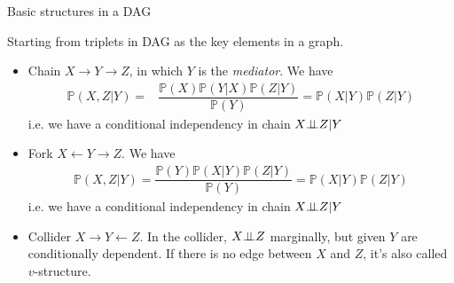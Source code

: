 \begin{point}
    Basic structures in a DAG 
\end{point}

Starting from triplets in DAG as the key elements in a graph.
\begin{itemize}[topsep=2pt,itemsep=0pt]
    \item Chain $ X\to Y\to Z $, in which $ Y $ is the \textit{mediator}. We have
    \begin{align}
        \mathbb{P}\left( X,Z|Y \right)=&\dfrac{\mathbb{P}\left( X \right) \mathbb{P}\left( Y|X \right) \mathbb{P}\left( Z|Y \right) }{\mathbb{P}\left( Y \right) }=\mathbb{P}\left( X|Y \right) \mathbb{P}\left( Z|Y \right) 
    \end{align}
    i.e. we have a conditional independency in chain $ X\bot\!\!\!\bot Z|Y $
    \item Fork $ X\leftarrow Y\rightarrow Z $. We have
    \begin{align}
        \mathbb{P}\left( X,Z|Y \right) = \dfrac{\mathbb{P}\left( Y \right) \mathbb{P}\left( X|Y \right) \mathbb{P}\left( Z|Y \right) }{\mathbb{P}\left( Y \right) }=\mathbb{P}\left( X|Y \right) \mathbb{P}\left( Z|Y \right)   
    \end{align}
    i.e. we have a conditional independency in chain $ X\bot\!\!\!\bot Z|Y $
    \item Collider $ X \to Y \leftarrow Z $. In the collider, $ X\bot\!\!\!\bot Z $ marginally, but given $ Y $ are conditionally dependent. If there is no edge between $ X $ and $ Z $, it's also called $ v $-structure.
\end{itemize}

